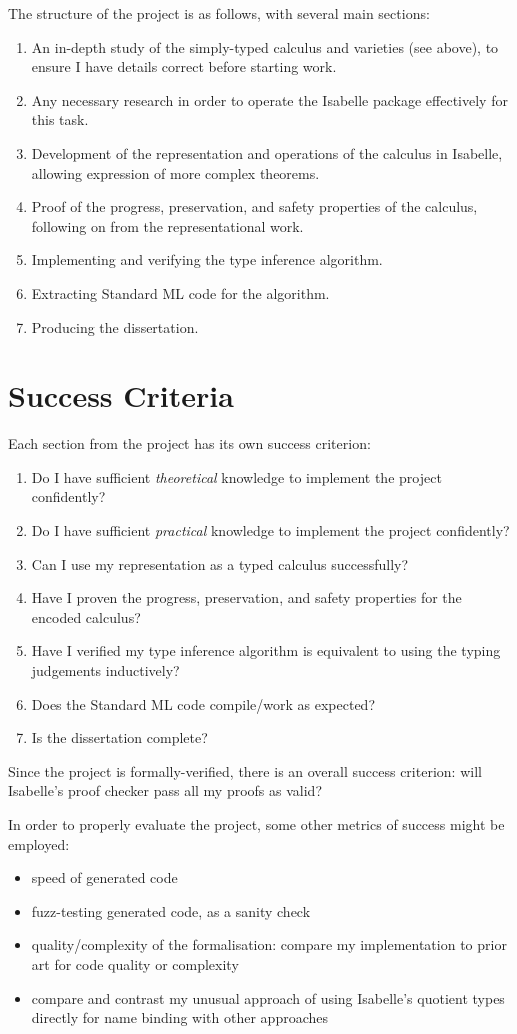 \documentclass[12pt]{article}
\begin{document}
The structure of the project is as follows, with several main sections:
\begin{enumerate}
\item
An in-depth study of the simply-typed calculus and varieties (see above), to ensure I have details correct before starting work.
\item
Any necessary research in order to operate the Isabelle package effectively for this task.
\item
Development of the representation and operations of the calculus in Isabelle, allowing expression of more complex theorems.
\item
Proof of the progress, preservation, and safety properties of the calculus, following on from the representational work.
\item
Implementing and verifying the type inference algorithm.
\item
Extracting Standard ML code for the algorithm.
\item
Producing the dissertation.
\end{enumerate}

\section*{Success Criteria}
Each section from the project has its own success criterion:
\begin{enumerate}
\item
Do I have sufficient \emph{theoretical} knowledge to implement the project confidently?
\item
Do I have sufficient \emph{practical} knowledge to implement the project confidently?
\item
Can I use my representation as a typed calculus successfully?
\item
Have I proven the progress, preservation, and safety properties for the encoded calculus?
\item
Have I verified my type inference algorithm is equivalent to using the typing judgements inductively?
\item
Does the Standard ML code compile/work as expected?
\item
Is the dissertation complete?
\end{enumerate}
Since the project is formally-verified, there is an overall success criterion: will Isabelle's proof checker pass all my proofs as valid?

In order to properly evaluate the project, some other metrics of success might be employed:
\begin{itemize}
\item
speed of generated code
\item
fuzz-testing generated code, as a sanity check
\item
quality/complexity of the formalisation: compare my implementation to prior art for code quality or complexity
\item
compare and contrast my unusual approach of using Isabelle's quotient types directly for name binding with other approaches
\end{itemize}
\end{document}
